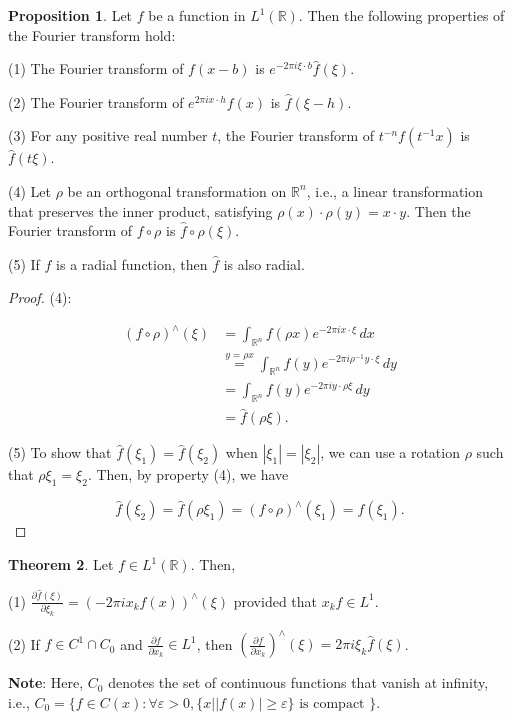 \documentclass[12pt,openany]{book}
\theoremstyle{definition}
\newtheorem{theorem}{Theorem}[section]
\newtheorem{proposition}[theorem]{Proposition}
\begin{document}
\begin{proposition}
    Let $f$ be a function in $L^{1}(\mathbb{R})$. Then the following properties of the Fourier transform hold:

(1) The Fourier transform of $f(x-b)$ is $e^{-2 \pi i \xi \cdot b} \hat{f}(\xi)$.

(2) The Fourier transform of $e^{2 \pi i x \cdot h} f(x)$ is $\hat{f}(\xi-h)$.

(3) For any positive real number $t$, the Fourier transform of $t^{-n} f(t^{-1} x)$ is $\hat{f}(t \xi)$.

(4) Let $\rho$ be an orthogonal transformation on $\mathbb{R}^n$, i.e., a linear transformation that preserves the inner product, satisfying $\rho(x) \cdot \rho(y) = x \cdot y$. Then the Fourier transform of $f \circ \rho$ is $\hat{f} \circ \rho(\xi)$.

(5) If $f$ is a radial function, then $\hat{f}$ is also radial.
\end{proposition}
\begin{proof}
(4):

    $$\begin{aligned}
(f \circ \rho)^{\wedge}(\xi) &= \int_{\mathbb{R}^n} f(\rho x) e^{-2 \pi i x \cdot \xi} \, dx \\
&\overset{y = \rho x}{=} \int_{\mathbb{R}^n} f(y) e^{-2 \pi i \rho^{-1} y \cdot \xi} \, dy \\
&= \int_{\mathbb{R}^n} f(y) e^{-2 \pi i y \cdot \rho \xi} \, dy \\
&= \hat{f}(\rho \xi).
\end{aligned}$$

(5) To show that $\hat{f}(\xi_1) = \hat{f}(\xi_2)$ when $|\xi_1| = |\xi_2|$, we can use a rotation $\rho$ such that $\rho \xi_1 = \xi_2$. Then, by property (4), we have

$$\hat{f}(\xi_2) = \hat{f}(\rho \xi_1) = (f \circ \rho)^{\wedge}(\xi_1) = \hat{f}(\xi_1).$$
\end{proof}
\begin{theorem}
    Let $f \in L^{1}(\mathbb{R})$. Then,

(1) $\frac{\partial \hat{f}(\xi)}{\partial \xi_k}=\left(-2 \pi i x_k f(x)\right)^{\wedge}(\xi)$ provided that $x_k f \in L^1$.

(2) If $f \in C^{1} \cap C_0$ and $\frac{\partial f}{\partial x_k} \in L^1$, then $\left(\frac{\partial f}{\partial x_k}\right)^{\wedge}(\xi)=2 \pi i \xi_k \hat{f}(\xi)$.

\noindent\textbf{Note}: Here, $C_0$ denotes the set of continuous functions that vanish at infinity, i.e., $C_0=\{f \in C(x): \forall \varepsilon>0, \{x | |f(x)| \geqslant \varepsilon\} \text{ is compact }\}$.
\end{theorem}
\end{document}
